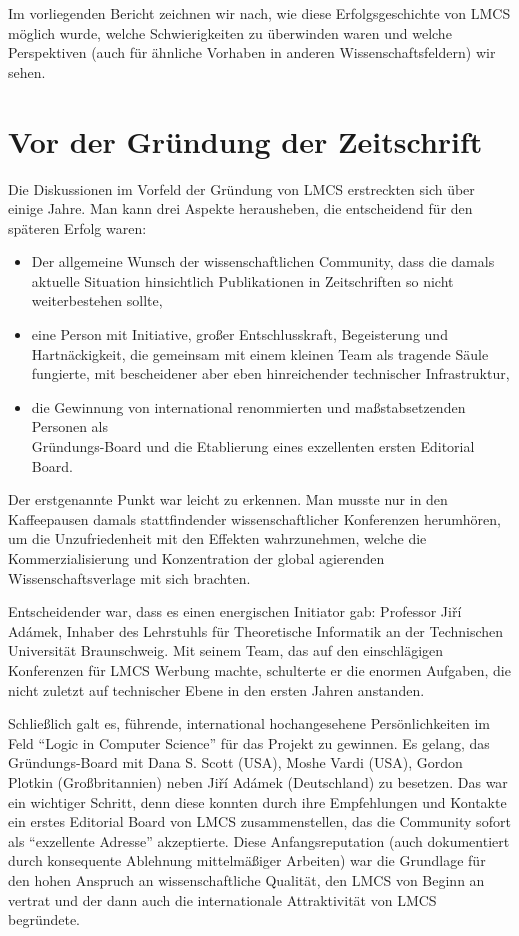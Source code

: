 \documentclass[a4paper,
fontsize=11pt,
oneside,
numbers=noperiodatend,
parskip=half-,
bibliography=totoc,
final
]{scrartcl}
\begin{document}
Im vorliegenden Bericht zeichnen wir nach, wie diese Erfolgsgeschichte
von LMCS möglich wurde, welche Schwierigkeiten zu überwinden waren und
welche Perspektiven (auch für ähnliche Vorhaben in anderen
Wissenschaftsfeldern) wir sehen.

\hypertarget{vor-der-gruxfcndung-der-zeitschrift}{%
\section{Vor der Gründung der
Zeitschrift}\label{vor-der-gruxfcndung-der-zeitschrift}}

Die Diskussionen im Vorfeld der Gründung von LMCS erstreckten sich über
einige Jahre. Man kann drei Aspekte herausheben, die entscheidend für
den späteren Erfolg waren:

\begin{itemize}
\tightlist
\item
  Der allgemeine Wunsch der wissenschaftlichen Community, dass die
  damals aktuelle Situation hinsichtlich Publikationen in Zeitschriften
  so nicht weiterbestehen sollte,
\item
  eine Person mit Initiative, großer Entschlusskraft, Begeisterung und
  Hartnäckigkeit, die gemeinsam mit einem kleinen Team als tragende
  Säule fungierte, mit bescheidener aber eben hinreichender technischer
  Infrastruktur,
\item
  die Gewinnung von international renommierten und maßstabsetzenden
  Personen als \\ Gründungs-Board und die Etablierung eines exzellenten
  ersten Editorial Board.
\end{itemize}

Der erstgenannte Punkt war leicht zu erkennen. Man musste nur in den
Kaffeepausen damals stattfindender wissenschaftlicher Konferenzen
herumhören, um die Unzufriedenheit mit den Effekten wahrzunehmen, welche
die Kommerzialisierung und Konzentration der global agierenden
Wissenschaftsverlage mit sich brachten.

Entscheidender war, dass es einen energischen Initiator gab: Professor
Jiří Adámek, Inhaber des Lehrstuhls für Theoretische Informatik an der
Technischen Universität Braunschweig. Mit seinem Team, das auf den
einschlägigen Konferenzen für LMCS Werbung machte, schulterte er die
enormen Aufgaben, die nicht zuletzt auf technischer Ebene in den ersten
Jahren anstanden.

Schließlich galt es, führende, international hochangesehene
Persönlichkeiten im Feld \enquote{Logic in Computer Science} für das
Projekt zu gewinnen. Es gelang, das Gründungs-Board mit Dana S. Scott
(USA), Moshe Vardi (USA), Gordon Plotkin (Großbritannien) neben Jiří
Adámek (Deutschland) zu besetzen. Das war ein wichtiger Schritt, denn
diese konnten durch ihre Empfehlungen und Kontakte ein erstes Editorial
Board von LMCS zusammenstellen, das die Community sofort als
\enquote{exzellente Adresse} akzeptierte. Diese Anfangsreputation (auch
dokumentiert durch konsequente Ablehnung mittelmäßiger Arbeiten) war die
Grundlage für den hohen Anspruch an wissenschaftliche Qualität, den LMCS
von Beginn an vertrat und der dann auch die internationale Attraktivität
von LMCS begründete.
\end{document}
